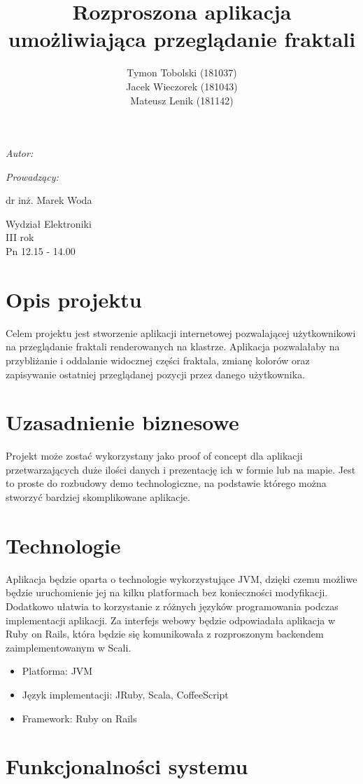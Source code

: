 \documentclass[wide,a4paper,titlepage,12pt]{article}
\title{Rozproszona aplikacja umożliwiająca przeglądanie fraktali}
\author{Tymon Tobolski {\small(181037)}\\ Jacek Wieczorek {\small(181043)} \\
Mateusz Lenik {\small(181142)}}
\makeatletter
\renewcommand{\maketitle}{
  \begin{titlepage}
    \begin{center}
      \vspace*{3cm}
      \LARGE \@title \par
      \vspace{2cm}
      \textit{\small Autor:}\par
      \normalsize \@author\par \normalsize
      \vspace{3cm}
      \textit{\small Prowadzący:}\par
      dr inż. Marek Woda \par
      \vspace{2cm}
      Wydział Elektroniki\\ III rok\\ Pn 12.15 - 14.00\par

    \end{center}
  \end{titlepage}
}
\makeatother
\begin{document}
\maketitle

\section*{Opis projektu}

Celem projektu jest stworzenie aplikacji internetowej pozwalającej użytkownikowi
na przeglądanie fraktali renderowanych na klastrze. Aplikacja
pozwalałaby na przybliżanie i oddalanie widocznej części fraktala, zmianę
kolorów oraz zapisywanie ostatniej przeglądanej pozycji przez danego
użytkownika.

\section*{Uzasadnienie biznesowe}

Projekt może zostać wykorzystany jako proof of concept dla aplikacji
przetwarzających duże ilości danych i prezentację ich w formie lub na mapie.
Jest to proste do rozbudowy demo technologiczne, na podstawie którego można
stworzyć bardziej skomplikowane aplikacje.

\section*{Technologie}

Aplikacja będzie oparta o technologie wykorzystujące JVM, dzięki czemu możliwe
będzie uruchomienie jej na kilku platformach bez konieczności modyfikacji.
Dodatkowo ułatwia to korzystanie z różnych języków programowania podczas
implementacji aplikacji. Za interfejs webowy będzie odpowiadała aplikacja w Ruby
on Rails, która będzie się komunikowała z rozproszonym backendem
zaimplementowanym w Scali.

\begin{itemize}
  \item Platforma: JVM
  \item Język implementacji: JRuby, Scala, CoffeeScript
  \item Framework: Ruby on Rails
\end{itemize}

\newpage
\section*{Funkcjonalności systemu}
\end{document}

